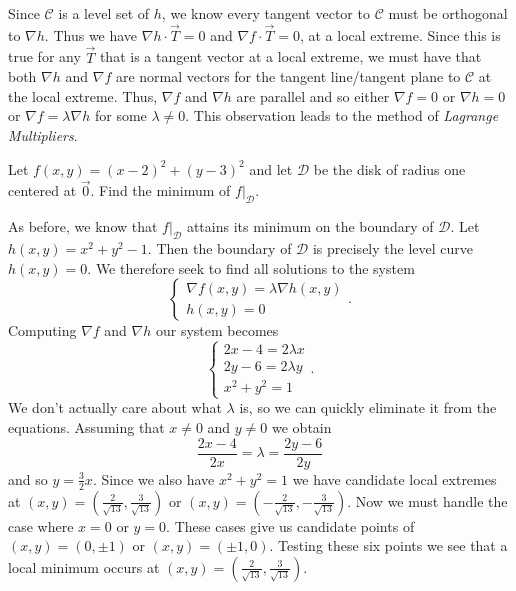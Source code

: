 Since $\mathcal C$ is a level set of $h$, we know every tangent vector to $\mathcal C$ must
be orthogonal to $\nabla h$.  Thus we have $\nabla h\cdot \vec T=0$ and $\nabla f\cdot \vec T=0$,
at a local extreme.  Since this is true for any $\vec T$ that is a tangent vector at a local extreme,
we must have that both $\nabla h$ and $\nabla f$ are normal vectors for the tangent line/tangent plane
to $\mathcal C$ at the local extreme.  Thus, $\nabla f$ and $\nabla h$ are parallel and so
either $\nabla f=0$ or $\nabla h=0$ or $\nabla f=\lambda \nabla h$ for some $\lambda\neq 0$.  This
observation leads to the method of \emph{Lagrange Multipliers}.

\begin{example}
	Let $f(x,y)=(x-2)^2+(y-3)^2$
	and let $\mathcal D$ be the disk of radius one centered at $\vec 0$.  Find
	the minimum of $f\big|_{\mathcal D}$.  

	As before, we know that $f\big|_{\mathcal D}$ attains its minimum on the boundary
	of $\mathcal D$.  Let $h(x,y)=x^2+y^2-1$.  Then the boundary of $\mathcal D$
	is precisely the level curve $h(x,y)=0$.
	We therefore seek to find all solutions to the system
	\[
		\begin{cases}
			\nabla f(x,y)=\lambda \nabla h(x,y)\\
			h(x,y)=0
		\end{cases}.
	\]
	Computing $\nabla f$ and $\nabla h$ our system becomes
	\[
		\begin{cases}
			2x-4=2\lambda x\\
			2y-6=2\lambda y\\
			x^2+y^2=1
		\end{cases}.
	\]
	We don't actually care about what $\lambda$ is, so we can quickly eliminate it from the equations.
	Assuming that $x\neq 0$ and $y\neq 0$ we obtain
	\[
		\frac{2x-4}{2x}=\lambda =\frac{2y-6}{2y}
	\]
	and so $y=\tfrac{3}{2}x$.  Since we also have $x^2+y^2=1$ we have candidate local
	extremes at $(x,y)=(\tfrac{2}{\sqrt{13}},
	\tfrac{3}{\sqrt{13}})$ or $(x,y)=(-\tfrac{2}{\sqrt{13}},-\tfrac{3}{\sqrt{13}})$.
	Now we must handle the case where $x=0$ or $y=0$.  These cases give us
	candidate points of $(x,y)=(0,\pm 1)$ or $(x,y)=(\pm 1,0)$.  Testing these six
	points we see that a local minimum occurs at $(x,y)=(\tfrac{2}{\sqrt{13}},
	\tfrac{3}{\sqrt{13}})$.
\end{example}


\begin{exercises}
\end{exercises}

